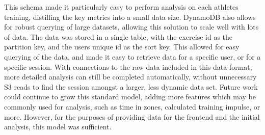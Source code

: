 This schema made it particularly easy to perform analysis on each athletes training, distilling the key metrics into a small data size. DynamoDB also allows for robust querying of large datasets, allowing this solution to scale well with lots of data. The data was stored in a single table, with the exercise id as the partition key, and the users unique id as the sort key. This allowed for easy querying of the data, and made it easy to retrieve data for a specific user, or for a specific session. With connections to the raw data included in this data format, more detailed analysis can still be completed automatically, without unnecessary S3 reads to find the session amongst a larger, less dynamic data set. Future work could continue to grow this standard model, adding more features which may be commonly used for analysis, such as time in zones, calculated training impulse, or more. However, for the purposes of providing data for the frontend and the initial analysis, this model was sufficient.

